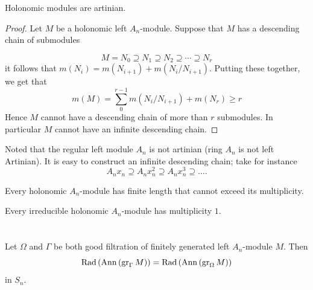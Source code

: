 \documentclass[12pt, oneside]{book}
\begin{document}
\begin{theorem}
    Holonomic modules are artinian.
    \begin{proof}
        Let $M$ be a holonomic left $A_n$-module. Suppose that $M$ has a descending chain of submodules

        \begin{equation*}
            M=N_0 \supseteq N_1 \supseteq N_2 \supseteq \cdots \supseteq N_r
        \end{equation*}
        it follows that $m\left(N_i\right)=m\left(N_{i+1}\right)+ m\left(N_i / N_{i+1}\right)$. Putting these together, we get that
        \begin{equation*}
            m(M)=\sum_0^{r-1} m\left(N_i / N_{i+1}\right)+m\left(N_r\right) \geq r
        \end{equation*}
        Hence $M$ cannot have a descending chain of more than $r$ submodules. In particular $M$ cannot have an infinite descending chain.
    \end{proof}

    \begin{remark}
        Noted that the regular left module $A_n$ is not artinian (ring $A_n$ is not left Artinian).
        It is easy to construct an infinite descending chain; take for instance
        \begin{equation*}
            A_n x_n \supseteq A_n x_n^2 \supseteq A_n x_n^3 \supseteq \ldots .
        \end{equation*}
    \end{remark}
\end{theorem}

\begin{corollary}
    Every holonomic $A_n$-module has finite length that cannot exceed its multiplicity.
\end{corollary}

\begin{corollary}
    Every irreducible holonomic $A_n$-module has multiplicity $1$.
\end{corollary}




\chapter{}




\begin{lemma}
    Let $\Omega$ and $\Gamma$ be both good filtration of finitely generated left $A_n$-module $M$.
    Then
    \begin{equation*}
        \operatorname{\operatorname{Rad}}\left( \operatorname{\operatorname{Ann}}\left( \operatorname{gr}_\Gamma M \right) \right)
        =
        \operatorname{\operatorname{Rad}}\left( \operatorname{\operatorname{Ann}}\left( \operatorname{gr}_\Omega M \right) \right)
    \end{equation*}
    in $S_n$.
\end{lemma}
\end{document}

